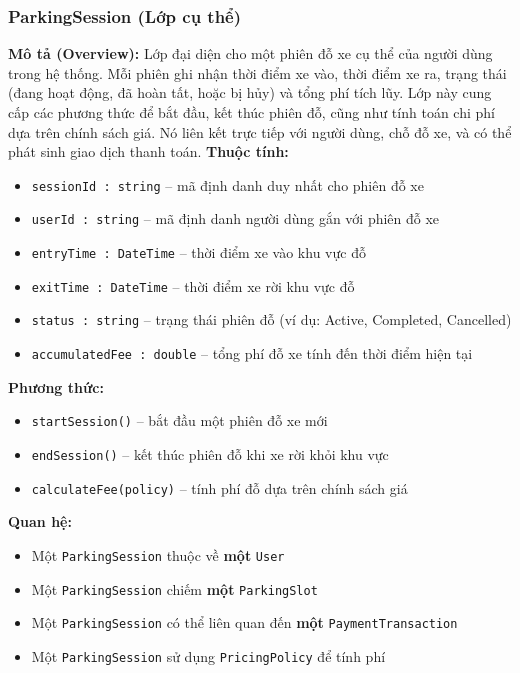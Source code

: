\subsubsection{ParkingSession (Lớp cụ thể)}
\textbf{Mô tả (Overview):} Lớp đại diện cho một phiên đỗ xe cụ thể của người dùng trong hệ thống. Mỗi phiên ghi nhận thời điểm xe vào, thời điểm xe ra, trạng thái (đang hoạt động, đã hoàn tất, hoặc bị hủy) và tổng phí tích lũy. Lớp này cung cấp các phương thức để bắt đầu, kết thúc phiên đỗ, cũng như tính toán chi phí dựa trên chính sách giá. Nó liên kết trực tiếp với người dùng, chỗ đỗ xe, và có thể phát sinh giao dịch thanh toán.
\textbf{Thuộc tính:}
\begin{itemize}[noitemsep]
  \item \texttt{sessionId : string} -- mã định danh duy nhất cho phiên đỗ xe
  \item \texttt{userId : string} -- mã định danh người dùng gắn với phiên đỗ xe
  \item \texttt{entryTime : DateTime} -- thời điểm xe vào khu vực đỗ
  \item \texttt{exitTime : DateTime} -- thời điểm xe rời khu vực đỗ
  \item \texttt{status : string} -- trạng thái phiên đỗ (ví dụ: Active, Completed, Cancelled)
  \item \texttt{accumulatedFee : double} -- tổng phí đỗ xe tính đến thời điểm hiện tại
\end{itemize}

\textbf{Phương thức:}
\begin{itemize}[noitemsep]
  \item \texttt{startSession()} -- bắt đầu một phiên đỗ xe mới
  \item \texttt{endSession()} -- kết thúc phiên đỗ khi xe rời khỏi khu vực
  \item \texttt{calculateFee(policy)} -- tính phí đỗ dựa trên chính sách giá
\end{itemize}

\textbf{Quan hệ:}
\begin{itemize}[noitemsep]
  \item Một \texttt{ParkingSession} thuộc về \textbf{một} \texttt{User}
  \item Một \texttt{ParkingSession} chiếm \textbf{một} \texttt{ParkingSlot}
  \item Một \texttt{ParkingSession} có thể liên quan đến \textbf{một} \texttt{PaymentTransaction}
  \item Một \texttt{ParkingSession} sử dụng \texttt{PricingPolicy} để tính phí
\end{itemize}

